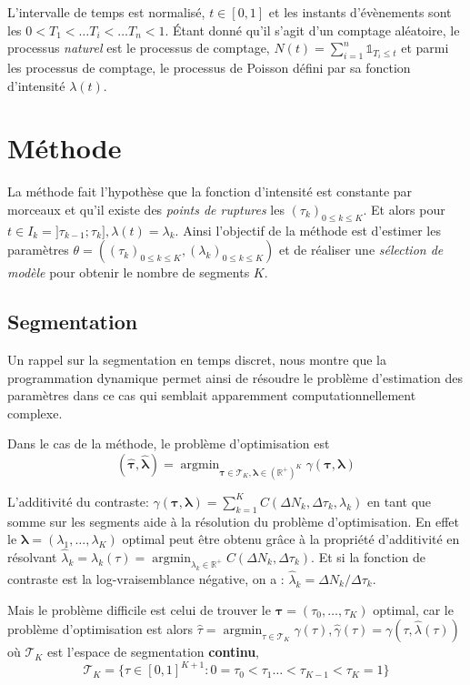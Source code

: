 \documentclass[a4paper,10pt]{article}\usepackage[]{graphicx}\usepackage[]{xcolor}
\DeclareMathOperator*{\argmin}{argmin}
\newcommand{\R}{\mathbb{R}}
\newcommand{\segspace}{\mathcal{T}_K}
\begin{document}
L'intervalle de temps est normalisé, $t\in[0,1]$ et les instants d'évènements 
sont les $0<T_1<\dots T_i<\dots T_n < 1$.
Étant donné qu'il s'agit d'un comptage aléatoire, le processus \emph{naturel}
est le processus de comptage, $N(t) = \sum_{i=1}^n \mathds{1}_{T_i \leq t}$ et 
parmi les processus de comptage, le processus de Poisson défini par sa fonction 
d'intensité $\lambda(t)$.\\

\section{Méthode}

La méthode fait l'hypothèse que la fonction d'intensité est constante par 
morceaux et qu'il existe des \emph{points de ruptures} les $(\tau_k)_{0\leq k \leq K}$.
Et alors pour $t \in I_k = ] \tau_{k-1}; \tau_{k} ], \lambda(t) = \lambda_k$.
Ainsi l'objectif de la méthode est d'estimer les paramètres 
$\theta =((\tau_k)_{0\leq k \leq K}, (\lambda_k)_{0\leq k \leq K} )$ et de 
réaliser une \emph{sélection de modèle} pour obtenir le nombre de segments $K$.

\subsection{Segmentation}

Un rappel sur la segmentation en temps discret, nous montre que la programmation
dynamique permet ainsi de résoudre le problème d'estimation des paramètres dans 
ce cas qui semblait apparemment computationnellement complexe.

Dans le cas de la méthode, le problème d'optimisation est 
$$(\widehat{\bm{\tau}}, \widehat{\bm{\lambda}}) = 
\argmin_{\bm{\tau}\in\segspace, \bm{\lambda} \in (\R^+)^K} \gamma (\bm{\tau}, \bm{\lambda})$$

L'additivité du contraste: $\gamma(\bm\tau, \bm\lambda) = 
\sum_{k=1}^K C(\Delta N_k, \Delta\tau_k, \lambda_k)$ en tant que somme sur les 
segments aide à la résolution du problème d'optimisation.
En effet le $\bm \lambda = (\lambda_1, \dots, \lambda_K)$ optimal peut être obtenu grâce à la propriété d'additivité
en résolvant $\widehat \lambda_k = \lambda_k (\tau) = \argmin_{\lambda_k \in \R^+} 
C(\Delta N_k, \Delta\tau_k)$.
Et si la fonction de contraste est la log-vraisemblance négative, on a : 
$\widehat \lambda_k = \Delta N_k / \Delta \tau_k$.

Mais le problème difficile est celui de trouver le $\bm\tau = (\tau_0, \dots, 
\tau_K)$ optimal, car le problème 
d'optimisation est alors $\widehat \tau = 
\argmin_{\tau\in\segspace} \widehat \gamma(\tau), 
\widehat \gamma(\tau) = \gamma (\tau, \widehat \lambda (\tau))$ où $\segspace$ 
est l'espace de segmentation \textbf{continu}, $$\segspace = 
\bigl\{ \tau \in [0,1]^{K+1} : 0 = \tau_0 < \tau_1 \dots < \tau_{K-1} < 
\tau_K = 1 \bigr\}$$
\end{document}

